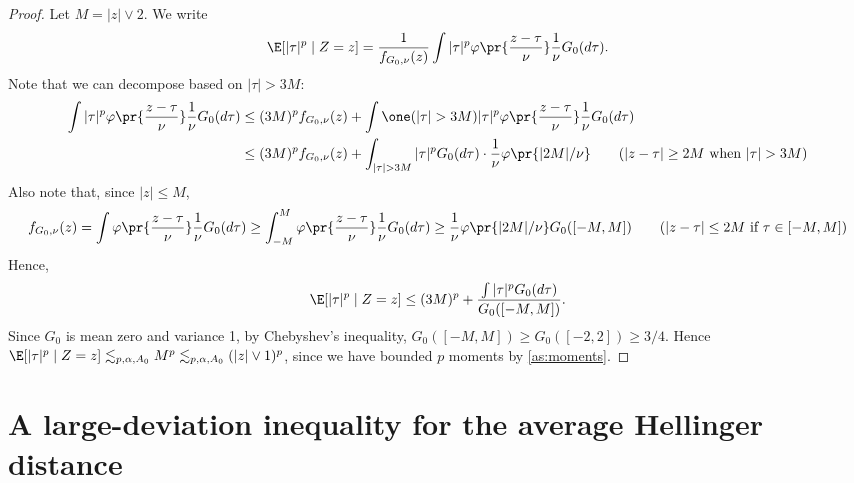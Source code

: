 \documentclass[12pt, reqno]{amsart}
\numberwithin{equation}{section}
\begin{document}
\begin{refsection}
\begin{appendices}
\begin{proof}
Let $M = |z| \vee 2$. We write \[
    \E[|\tau|^p \mid Z=z] = \frac{1}{f_{G_0, \nu}(z)} \int |\tau|^p
    \varphi\pr{\frac{z-\tau}{\nu}} \frac{1}{\nu} G_0(d\tau).
    \]
    Note that we can decompose based on $|\tau| > 3M$: 
    \begin{align*}
    \int |\tau|^p
    \varphi\pr{\frac{z-\tau}{\nu}} \frac{1}{\nu} G_0(d\tau) &\le (3M)^pf_{G_0, \nu}(z) +
    \int \one(|\tau| > 3M) |\tau|^p \varphi\pr{\frac{z-\tau}{\nu}}\frac{1}
    {\nu} G_0(d\tau)
    \\
    &\le (3M)^pf_{G_0, \nu}(z) + \int_{|\tau | > 3M} |\tau|^p G_0(d\tau) \cdot  \frac{1}
    {\nu}\varphi\pr{|2M|/\nu} \tag{$|z-\tau| \ge 2M$ when $|\tau| > 3M$}
    \end{align*}
    Also note that, since $|z| \le M$, \begin{align*}
    f_{G_0, \nu}(z) = \int \varphi\pr{\frac{z-\tau}{\nu}}\frac{1}
    {\nu} G_0(d\tau) 
\ge \int_{-M}^M \varphi\pr{\frac{z-\tau}{\nu}}\frac{1}
    {\nu} G_0(d\tau)
    \ge \frac{1}{\nu} \varphi\pr{|2M| / \nu} G_0([-M, M])
    \tag{$|z-\tau|
        \le 2M$ if $\tau \in [-M, M]$}
    \end{align*}
    Hence, \[
    \E[|\tau|^p \mid Z=z] \le (3M)^p + \frac{\int |\tau|^p
    G_0(d\tau)}{G_0([-M,M])}.
    \]
    Since $G_0$ is mean zero and variance 1, by Chebyshev's inequality, $G_0([-M, M]) \ge
    G_0([-2,2]) \ge 3/4$. Hence $
    \E[|\tau|^p \mid Z=z] \lesssim_{p, \alpha, A_0} M^p \lesssim_{p, \alpha, A_0} (|z| \vee 1)^p
    $,
    since we have bounded $p$\th{} moments by \cref{as:moments}.
\end{proof}






\section{A large-deviation inequality for the average Hellinger distance}
\label{sec:hellinger}


\end{appendices}
\end{refsection}
\end{document}
